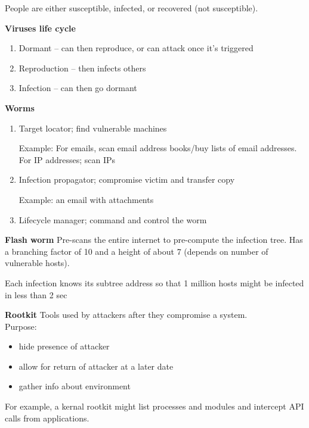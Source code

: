 People are either susceptible, infected, or recovered (not susceptible).

\textbf{Viruses life cycle}
\begin{enumerate}
	\item Dormant -- can then reproduce, or can attack once it's triggered
	\item Reproduction -- then infects others
	\item Infection -- can then go dormant
\end{enumerate}

\textbf{Worms}
\begin{enumerate}
	\item Target locator; find vulnerable machines

	Example: For emails, scan email address books/buy lists of email addresses. For IP addresses; scan IPs
	\item Infection propagator; compromise victim and transfer copy

	Example: an email with attachments
	\item Lifecycle manager; command and control the worm
\end{enumerate}


\textbf{Flash worm}
Pre-scans the entire internet to pre-compute the infection tree. Has a branching factor of 10 and a height of about 7 (depends on number of vulnerable hosts).

Each infection knows its subtree address so that 1 million hosts might be infected in less than 2 sec

\textbf{Rootkit}
Tools used by attackers after they compromise a system.\\
Purpose: 
\begin{itemize}
	\item hide presence of attacker
	\item allow for return of attacker at a later date
	\item gather info about environment
\end{itemize}
For example, a kernal rootkit might list processes and modules and intercept API calls from applications.

